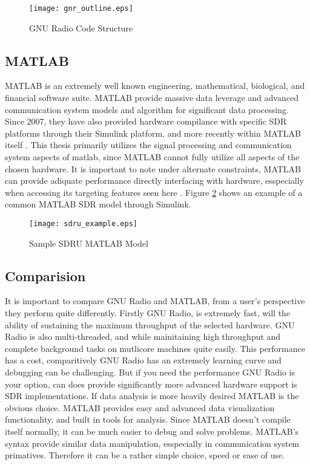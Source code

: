 \begin{figure}\label{gnr_struct}
\centering
\texttt{[image: gnr\_outline.eps]}
\caption{GNU Radio Code Structure}
\end{figure}

\subsection{MATLAB}

MATLAB is an extremely well known engineering, mathematical, biological, and financial software suite.  MATLAB provide massive data leverage and advanced communication system models and algorithm for significant data processing.  Since 2007, they have also provided hardware compilance with specific SDR platforms through their Simulink platform, and more recently within MATLAB itself \cite{matlabsdru}.  This thesis primarily utilizes the signal processing and communication system aspects of matlab, since MATLAB cannot fully utilize all aspects of the chosen hardware.  It is important to note under alternate constraints, MATLAB can provide adiquate performance directly interfacing with hardware, esspecially when accessing its targeting features seen here \cite{matlabtargeting}.  Figure \ref{sdru_example} shows an example of a common MATLAB SDR model through Simulink.\\

\begin{figure}[!ht]\label{sdru_example}
\centering
\texttt{[image: sdru\_example.eps]}
\caption{Sample SDRU MATLAB Model}
\end{figure}

\subsection{Comparision}

It is important to compare GNU Radio and MATLAB, from a user's perspective they perform quite differently.  Firstly GNU Radio, is extremely fast, will the ability of sustaining the maximum throughput of the selected hardware.  GNU Radio is also multi-threaded, and while mainitaining high throughput and complete background tasks on mutlicore machines quite easily.  This performance has a cost, comparitively GNU Radio has an extremely learning curve and debugging can be challenging.  But if you need the performance GNU Radio is your option, can does provide significantly more advanced hardware support is SDR implementations.  If data analysis is more heavily desired MATLAB is the obvious choice.  MATLAB provides easy and advanced data visualization functionality, and built in tools for analysis.  Since MATLAB doesn't compile itself normally, it can be much easier to debug and solve problems.  MATLAB's syntax provide similar data manipulation, esspecially in communication system primatives.  Therefore it can be a rather simple choice, speed or ease of use.\\ 

